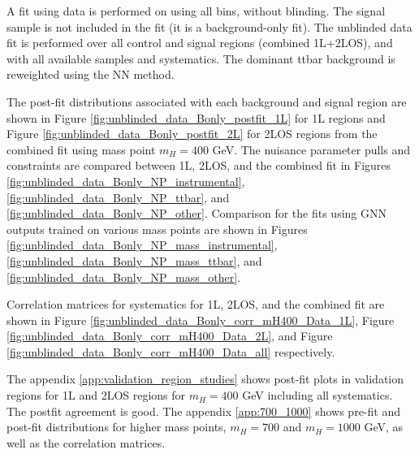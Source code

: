 A fit using data is performed on using all bins, without blinding. The signal sample is not included in the fit (it is a background-only fit). The unblinded data fit is performed over all control and signal regions (combined 1L+2LOS), and with all available samples and systematics. The dominant ttbar background is reweighted using the NN method.

The post-fit distributions associated with each background and signal region are shown in Figure \ref{fig:unblinded_data_Bonly_postfit_1L} for 1L regions and Figure \ref{fig:unblinded_data_Bonly_postfit_2L} for 2LOS regions from the combined fit using mass point $m_H=400$ GeV. The nuisance parameter pulls and constraints are compared between 1L, 2LOS, and the combined fit in Figures \ref{fig:unblinded_data_Bonly_NP_instrumental}, \ref{fig:unblinded_data_Bonly_NP_ttbar}, and \ref{fig:unblinded_data_Bonly_NP_other}. Comparison for the fits using GNN outputs trained on various mass points are shown in Figures \ref{fig:unblinded_data_Bonly_NP_mass_instrumental}, \ref{fig:unblinded_data_Bonly_NP_mass_ttbar}, and \ref{fig:unblinded_data_Bonly_NP_mass_other}.

Correlation matrices for systematics for 1L, 2LOS, and the combined fit are shown in Figure \ref{fig:unblinded_data_Bonly_corr_mH400_Data_1L}, Figure \ref{fig:unblinded_data_Bonly_corr_mH400_Data_2L}, and Figure \ref{fig:unblinded_data_Bonly_corr_mH400_Data_all} respectively.

The appendix \ref{app:validation_region_studies} shows post-fit plots in validation regions for 1L and 2LOS regions for $m_H=400$ GeV including all systematics. The postfit agreement is good. The appendix \ref{app:700_1000} shows pre-fit and post-fit distributions for higher mass points, $m_H=700$ and $m_H=1000$ GeV, as well as the correlation matrices.

